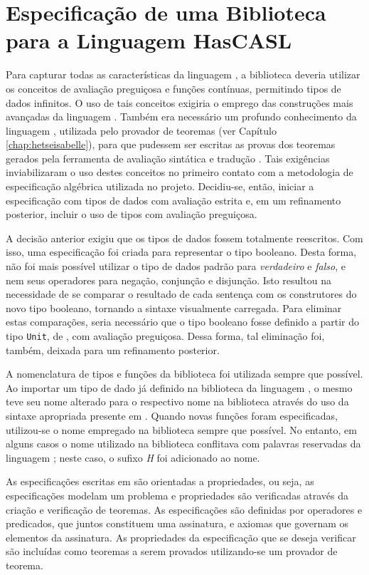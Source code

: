 \chapter{Especificação de uma Biblioteca para a Linguagem HasCASL}
\label{chap:desenvBiblioteca}

Para capturar todas as características da linguagem \Haskell, a biblioteca deveria utilizar os conceitos de avaliação preguiçosa e funções contínuas, permitindo tipos de dados infinitos.
O uso de tais conceitos exigiria o emprego das construções mais avançadas da linguagem \HasCASL.
Também era necessário um profundo conhecimento da linguagem \HOL, utilizada pelo provador de teoremas \Isabelle (ver Capítulo \ref{chap:hetseisabelle}), para que pudessem ser escritas as provas dos teoremas gerados pela ferramenta de avaliação sintática e tradução \Hets.
Tais exigências inviabilizaram o uso destes conceitos no primeiro contato com a metodologia de especificação algébrica utilizada no projeto.
Decidiu-se, então, iniciar a especificação com tipos de dados com avaliação estrita e, em um refinamento posterior, incluir o uso de tipos com avaliação preguiçosa.

A decisão anterior exigiu que os tipos de dados fossem totalmente reescritos.
Com isso, uma especificação foi criada para representar o tipo booleano.
Desta forma, não foi mais possível utilizar o tipo de dados padrão para \textit{verdadeiro} e \textit{falso}, e nem seus operadores para negação, conjunção e disjunção.
Isto resultou na necessidade de se comparar o resultado de cada sentença com os construtores do novo tipo booleano, tornando a sintaxe visualmente carregada.
Para eliminar estas comparações, seria necessário que o tipo booleano fosse definido a partir do tipo \Verb.Unit., de \CASL, com avaliação preguiçosa.
Dessa forma, tal eliminação foi, também, deixada para um refinamento posterior.

A nomenclatura de tipos e funções da biblioteca \Prelude foi utilizada sempre que possível.
Ao importar um tipo de dado já definido na biblioteca da linguagem \CASL, o mesmo teve seu nome alterado para o respectivo nome na biblioteca \Prelude através do uso da sintaxe apropriada presente em \HasCASL.
Quando novas funções foram especificadas, utilizou-se o nome empregado na biblioteca \Prelude sempre que possível.
No entanto, em alguns casos o nome utilizado na biblioteca \Prelude conflitava com palavras reservadas da linguagem \HasCASL; neste caso, o sufixo \textit{H} foi adicionado ao nome.

As especificações escritas em \HasCASL são orientadas a propriedades, ou seja, as especificações modelam um problema e propriedades são verificadas através da criação e verificação de teoremas.
As especificações são definidas por operadores e predicados, que juntos constituem uma assinatura, e axiomas que governam os elementos da assinatura.
As propriedades da especificação que se deseja verificar são incluídas como teoremas a serem provados utilizando-se um provador de teorema.

